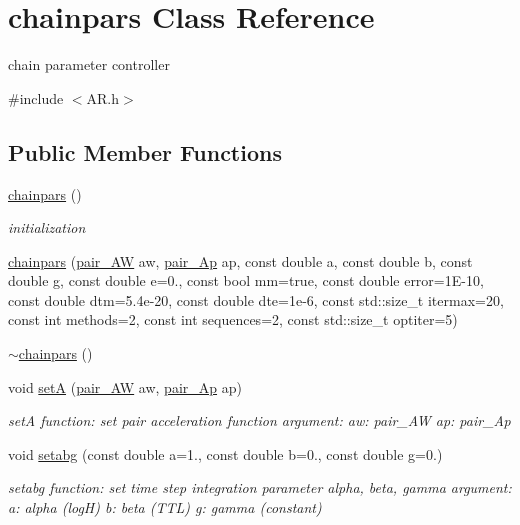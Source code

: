 \hypertarget{classchainpars}{}\section{chainpars Class Reference}
\label{classchainpars}


chain parameter controller  




{\ttfamily \#include $<$A\+R.\+h$>$}

\subsection*{Public Member Functions}
\begin{DoxyCompactItemize}
\item 
\hyperlink{classchainpars_a9836082e4bce43f405a5d16a2bcc6f98}{chainpars} ()
\begin{DoxyCompactList}\small\item\em initialization \end{DoxyCompactList}\item 
\hyperlink{classchainpars_a7d25bebe5a1facfc2d4cff38b17ef2d4}{chainpars} (\hyperlink{AR_8h_a0b1ff9eb7f37c90dc26918b4ec3a829d}{pair\+\_\+\+AW} aw, \hyperlink{AR_8h_a9ba933d6e3fcd6363bc2e7eb341e1f5d}{pair\+\_\+\+Ap} ap, const double a, const double b, const double g, const double e=0., const bool mm=true, const double error=1\+E-\/10, const double dtm=5.\+4e-\/20, const double dte=1e-\/6, const std\+::size\+\_\+t itermax=20, const int methods=2, const int sequences=2, const std\+::size\+\_\+t optiter=5)
\item 
\hyperlink{classchainpars_a5477732462d570fcf179599f96c5b97f}{$\sim$chainpars} ()
\item 
void \hyperlink{classchainpars_a4ff03f287a4200ae41c61bb340111a9b}{setA} (\hyperlink{AR_8h_a0b1ff9eb7f37c90dc26918b4ec3a829d}{pair\+\_\+\+AW} aw, \hyperlink{AR_8h_a9ba933d6e3fcd6363bc2e7eb341e1f5d}{pair\+\_\+\+Ap} ap)
\begin{DoxyCompactList}\small\item\em setA function\+: set pair acceleration function argument\+: aw\+: pair\+\_\+\+AW ap\+: pair\+\_\+\+Ap \end{DoxyCompactList}\item 
void \hyperlink{classchainpars_af0e28b16eb33ca55032972fca9f7e660}{setabg} (const double a=1., const double b=0., const double g=0.)
\begin{DoxyCompactList}\small\item\em setabg function\+: set time step integration parameter alpha, beta, gamma argument\+: a\+: alpha (logH) b\+: beta (T\+TL) g\+: gamma (constant) \end{DoxyCompactList}\item 

\end{DoxyCompactItemize}
